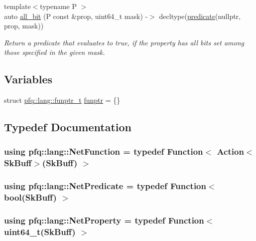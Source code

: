 \begin{DoxyCompactItemize}
{\footnotesize template$<$typename P $>$ }\\auto \hyperlink{namespacepfq_1_1lang_a62b1989f7b5d84549a99b1df46743bd6}{all\+\_\+bit} (P const \&prop, uint64\+\_\+t mask) -\/$>$ decltype(\hyperlink{namespacepfq_1_1lang_aca9adafc436b7f851621b979fa1aaf88}{predicate}(nullptr, prop, mask))
\begin{DoxyCompactList}\small\item\em Return a predicate that evaluates to {\ttfamily true}, if the property has all bits set among those specified in the given mask. \end{DoxyCompactList}\end{DoxyCompactItemize}
\subsection*{Variables}
\begin{DoxyCompactItemize}
\item 
struct \hyperlink{structpfq_1_1lang_1_1funptr__t}{pfq\+::lang\+::funptr\+\_\+t} \hyperlink{namespacepfq_1_1lang_a8d957b8f6df7198413d3ff9bd698e682}{funptr} = \{\}
\end{DoxyCompactItemize}


\subsection{Typedef Documentation}
\hypertarget{namespacepfq_1_1lang_aa02ee91ad7ff586907fc8526b84e0f53}{
\subsubsection[{Net\+Function}]{\setlength{\rightskip}{0pt plus 5cm}using {\bf pfq\+::lang\+::\+Net\+Function} = typedef {\bf Function}$<$ {\bf Action}$<${\bf Sk\+Buff}$>$({\bf Sk\+Buff}) $>$}}\label{namespacepfq_1_1lang_aa02ee91ad7ff586907fc8526b84e0f53}
\hypertarget{namespacepfq_1_1lang_a3c5b96416a3c3834aefd442157498bbd}{
\subsubsection[{Net\+Predicate}]{\setlength{\rightskip}{0pt plus 5cm}using {\bf pfq\+::lang\+::\+Net\+Predicate} = typedef {\bf Function}$<$ bool({\bf Sk\+Buff}) $>$}}\label{namespacepfq_1_1lang_a3c5b96416a3c3834aefd442157498bbd}
\hypertarget{namespacepfq_1_1lang_aa39ba7aedac05c562ea2f9f399e7f370}{
\subsubsection[{Net\+Property}]{\setlength{\rightskip}{0pt plus 5cm}using {\bf pfq\+::lang\+::\+Net\+Property} = typedef {\bf Function}$<$ uint64\+\_\+t({\bf Sk\+Buff}) $>$}}\label{namespacepfq_1_1lang_aa39ba7aedac05c562ea2f9f399e7f370}


